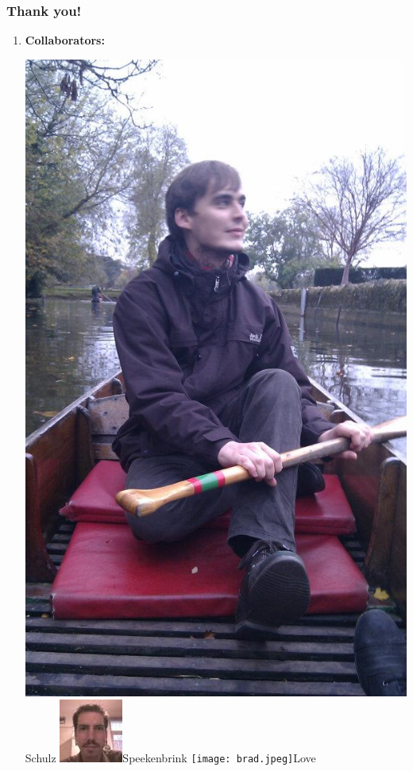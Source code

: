 \documentclass{beamer}
\begin{document}
\begin{frame}
	\frametitle{Thank you!}
	\begin{enumerate}
		\item \textbf{Collaborators:}\\
		\begin{center}
			\includegraphics[scale=0.013]{Eric.jpg}Schulz\hspace{0.2cm}
			\includegraphics[scale=0.2]{maarten2.jpg}Speekenbrink\hspace{0.2cm}
			\texttt{[image: brad.jpeg]}Love
		\end{center}
	\end{enumerate}
\end{frame}
\end{document}
